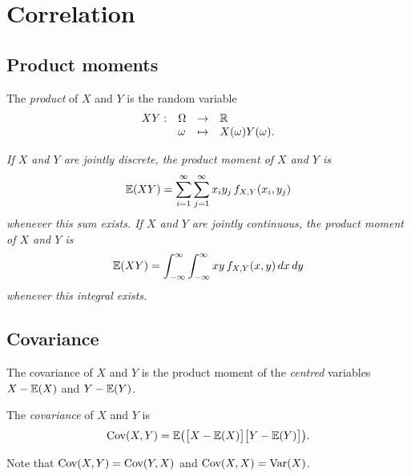 
\section{Correlation}\label{sec:correlation}

\subsection{Product moments}

\begin{definition}\label{def:prod_rvs}
The \emph{product} of $X$ and $Y$ is the random variable
\[
\begin{array}{rlcl}
XY : 	& \Omega & \to 		& \mathbb{R} \\
		& \omega & \mapsto	& X(\omega)Y(\omega).
\end{array}
\]
\end{definition}

\begin{definition}
\ben
\it %
If $X$ and $Y$ are jointly discrete, the \emph{product moment} of $X$ and $Y$ is
\[
\mathbb{E}(XY) = \sum_{i=1}^{\infty}\sum_{j=1}^{\infty} x_iy_j\, f_{X,Y}(x_i,y_j)
\]
whenever this sum exists.
\it %
If $X$ and $Y$ are jointly continuous, the \emph{product moment} of $X$ and $Y$ is
\[
\mathbb{E}(XY) = \int_{-\infty}^{\infty}\int_{-\infty}^{\infty} xy\, f_{X,Y}(x,y)\,dx\,dy
\]
whenever this integral exists.
\een
\end{definition}
%

\subsection{Covariance}
The covariance of $X$ and $Y$ is the product moment of the \emph{centred} variables $X-\mathbb{E}(X)$ and $Y-\mathbb{E}(Y)$.

\begin{definition}\label{def:covariance}
The \emph{covariance} of $X$ and $Y$ is 
\[
\text{Cov}(X,Y) = \mathbb{E}\big(\big[X-\mathbb{E}(X)\big]\big[Y-\mathbb{E}(Y)\big]\big).
\]
\end{definition}

\begin{remark}
Note that $\text{Cov}(X,Y)=\text{Cov}(Y,X)$ and $\text{Cov}(X,X)=\text{Var}(X)$.
\end{remark}

